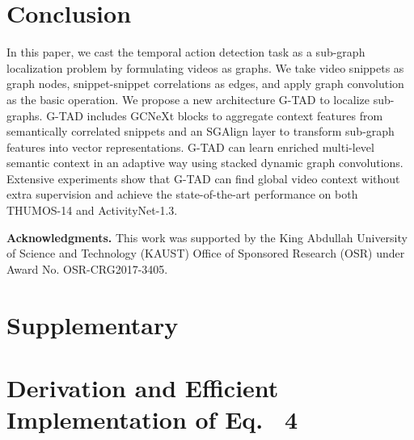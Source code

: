 \documentclass[10pt,twocolumn,letterpaper]{article}
\begin{document}
 \section{Conclusion}
In this paper, 
we cast the temporal action detection task as a sub-graph localization problem by formulating videos as graphs.
We take video snippets as graph nodes, snippet-snippet correlations as edges, and apply graph convolution as the basic operation.
We propose a new architecture G-TAD to localize sub-graphs. G-TAD includes GCNeXt blocks to aggregate context features from semantically correlated snippets  and an SGAlign layer to transform sub-graph features into vector representations. 
G-TAD can learn enriched multi-level semantic context in an adaptive way using stacked dynamic graph convolutions.
Extensive experiments show that G-TAD can find global video context without extra supervision and achieve the state-of-the-art performance on both THUMOS-14 and ActivityNet-1.3.%
 
\noindent
{\textbf{Acknowledgments.} This work was supported by the King Abdullah University of Science and Technology (KAUST) Office of Sponsored Research (OSR) under Award No. OSR-CRG2017-3405.}

\newpage
{\small


}


\onecolumn
\clearpage
\newpage
\section{Supplementary}
\setcounter{section}{0}
\renewcommand{\thesection}{\Alph{section}}
\renewcommand{\theHsection}{appendixsection.\Alph{section}}





































\section{Derivation and Efficient Implementation of Eq.~{\color{red} 4}}
\end{document}
